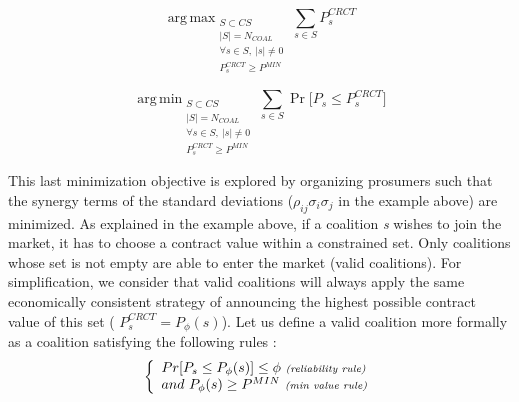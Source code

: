 \documentclass[conference]{IEEEtran}
\DeclareMathOperator*{\argmin}{arg\,min}
\DeclareMathOperator*{\argmax}{arg\,max}
\begin{document}
\begin{equation}
  \argmax _{\substack{ S \subset CS \\ 
                      |S| = N_{COAL} \\ 
                      \forall s \in S,\ |s| \neq 0 
                      \\ P_{s}^{CRCT} \geq P^{MIN}}}
   \sum_{s \in S}  P_{s}^{CRCT}
  \label{problem_1}
\end{equation}  

 \begin{equation}
  \argmin _{\substack{ S \subset CS \\ 
                      |S| = N_{COAL} \\ 
                      \forall s \in S,\ |s| \neq 0 
                      \\ P_{s}^{CRCT} \geq P^{MIN}}}
   \sum_{s \in S}  \Pr \bigl[ P_{s} \leq P_{s}^{CRCT} \bigr]
  \label{problem_2}
\end{equation}  

This last minimization objective is explored by organizing prosumers such that the synergy terms of the standard deviations ($ \rho_{ij}\sigma_{i}\sigma_{j} $ in the example above) are minimized. As explained in the example above, if a coalition \textit{s} wishes to join the market, it has to choose a contract value within a constrained set. Only coalitions whose set is not empty are able to enter the market (valid coalitions). For simplification, we consider that valid coalitions will always apply the same economically consistent strategy of announcing the highest possible contract value of this set ( $ P_{s}^{CRCT} = P_{\phi}(s) $).
Let us define a valid coalition more formally as a coalition satisfying the following rules :
\begin{equation}
\left\{ \begin{array}{lll}
		Pr[ P_{s} \leq P_{\phi}(s)] \leq \phi\ \textit{{\scriptsize (reliability rule)}} \\
		and\ P_{\phi}(s) \geq P^{MIN}\ \textit{{\scriptsize (min value rule)}}

\end{array} \right. 
\label{rules}
\end{equation}
\end{document}
